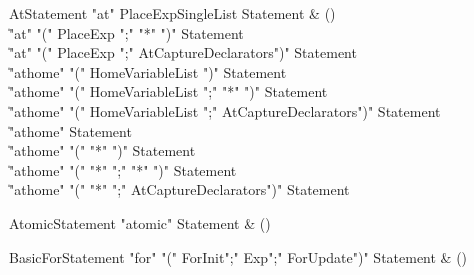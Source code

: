 \begin{bbgrammar}

AtStatement \label{prod:AtStatement}  \: \xcd"at" PlaceExpSingleList Statement & () \\

    \| \xcd"at" \xcd"(" PlaceExp \xcd";" \xcd"*" \xcd")" Statement \\
    \| \xcd"at" \xcd"(" PlaceExp \xcd";" AtCaptureDeclarators\opt \xcd")" Statement \\
    \| \xcd"athome" \xcd"(" HomeVariableList \xcd")" Statement \\
    \| \xcd"athome" \xcd"(" HomeVariableList \xcd";" \xcd"*" \xcd")" Statement \\
    \| \xcd"athome" \xcd"(" HomeVariableList \xcd";" AtCaptureDeclarators\opt \xcd")" Statement \\
    \| \xcd"athome" Statement \\
    \| \xcd"athome" \xcd"(" \xcd"*" \xcd")" Statement \\
    \| \xcd"athome" \xcd"(" \xcd"*" \xcd";" \xcd"*" \xcd")" Statement \\
    \| \xcd"athome" \xcd"(" \xcd"*" \xcd";" AtCaptureDeclarators\opt \xcd")" Statement \\

\end{bbgrammar}

\begin{bbgrammar}

AtomicStatement \label{prod:AtomicStatement}  \: \xcd"atomic" Statement & () \\


\end{bbgrammar}

\begin{bbgrammar}

BasicForStatement \label{prod:BasicForStatement}  \: \xcd"for" \xcd"(" ForInit\opt \xcd";" Exp\opt \xcd";" ForUpdate\opt \xcd")" Statement & () \\


\end{bbgrammar}

